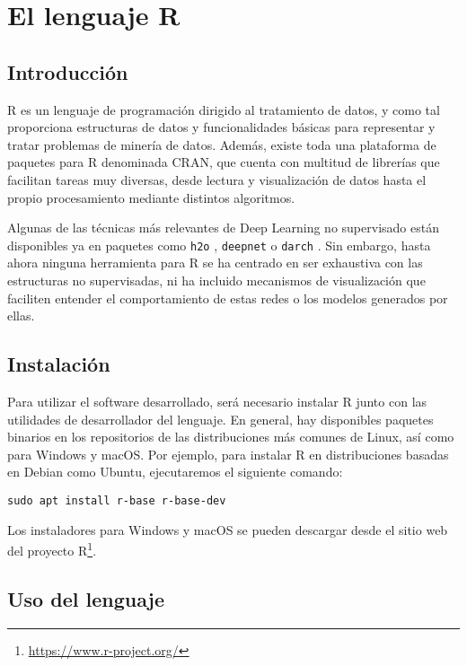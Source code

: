 \section{El lenguaje R}\label{introducciuxf3n-a-r}

\subsection{Introducción}

R \autocite{rlang} es un lenguaje de programación dirigido al tratamiento de datos, y
como tal proporciona estructuras de datos y funcionalidades básicas para
representar y tratar problemas de minería de datos. Además, existe toda
una plataforma de paquetes para R denominada CRAN, que cuenta con
multitud de librerías que facilitan tareas muy diversas, desde lectura y
visualización de datos hasta el propio procesamiento mediante distintos
algoritmos.

Algunas de las técnicas más relevantes de Deep Learning no supervisado
están disponibles ya en paquetes como \texttt{h2o} \autocite{h2o},
\texttt{deepnet} \autocite{deepnet} o \texttt{darch} \autocite{darch}.
Sin embargo, hasta ahora ninguna herramienta para R se ha centrado en ser exhaustiva con las estructuras no supervisadas, ni ha incluido mecanismos de visualización que faciliten entender el comportamiento de
estas redes o los modelos generados por ellas.

\subsection{Instalación}

Para utilizar el software desarrollado, será necesario instalar R junto con las utilidades de desarrollador del lenguaje. En general, hay disponibles paquetes binarios en los repositorios de las distribuciones más comunes de Linux, así como para Windows y macOS. Por ejemplo, para instalar R en distribuciones basadas en Debian como Ubuntu, ejecutaremos el siguiente comando:

\begin{verbatim}
sudo apt install r-base r-base-dev
\end{verbatim}

Los instaladores para Windows y macOS se pueden descargar desde el sitio web del proyecto R\footnote{\url{https://www.r-project.org/}}.

\subsection{Uso del lenguaje}

